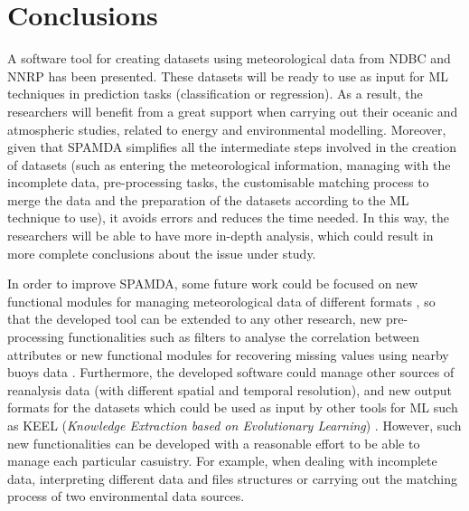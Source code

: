 \documentclass[energies,article,submit,moreauthors,pdftex]{Definitions/mdpi}
\begin{document}
		
	\section{Conclusions}\label{sec:Conclusions}

		A software tool for creating datasets using meteorological data from NDBC and NNRP has been presented. These datasets will be ready to use as input for ML techniques in prediction tasks (classification or regression). As a result, the researchers will benefit from a great support when carrying out their oceanic and atmospheric studies, related to energy and environmental modelling. Moreover, given that SPAMDA simplifies all the intermediate steps involved in the creation of datasets (such as entering the meteorological information, managing with the incomplete data, pre-processing tasks, the customisable matching process to merge the data and the preparation of the datasets according to the ML technique to use), it avoids errors and reduces the time needed. In this way, the researchers will be able to have more in-depth analysis, which could result in more complete conclusions about the issue under study.
		
		In order to improve SPAMDA, some future work could be focused on new functional modules for managing meteorological data of different formats \cite{NOAA_3}, so that the developed tool can be extended to any other research, new pre-processing functionalities such as filters to analyse the correlation between attributes or new functional modules for recovering missing values using nearby buoys data \cite{DuranRosal2016}. Furthermore, the developed software could manage other sources of reanalysis data (with different spatial and temporal resolution), and new output formats for the datasets which could be used as input by other tools for ML such as KEEL (\textit{Knowledge Extraction based on Evolutionary Learning}) \cite{AlcalFdez2009KEELAS}. However, such new functionalities can be developed with a reasonable effort to be able to manage each particular casuistry. For example, when dealing with incomplete data, interpreting different data and files structures or carrying out the matching process of two environmental data sources.

\vspace{6pt} 

\end{document}
